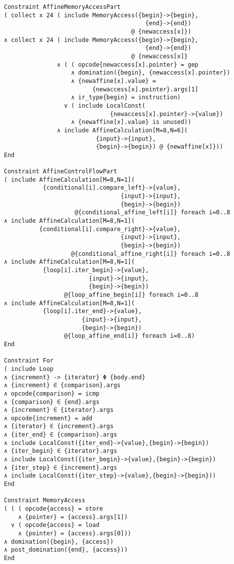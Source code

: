 \begin{lstlisting}
Constraint AffineMemoryAccessPart
( collect x 24 ( include MemoryAccess({begin}->{begin},
                                        {end}->{end})
                                    @ {newaccess[x]})
∧ collect x 24 ( include MemoryAccess({begin}->{begin},
                                        {end}->{end})
                                    @ {newaccess[x]}
               ∧ ( ( opcode{newaccess[x].pointer} = gep
                   ∧ domination({begin}, {newaccess[x].pointer})
                   ∧ {newaffine[x].value} =
                         {newaccess[x].pointer}.args[1]
                   ∧ ir_type{begin} = instruction)
                 ∨ ( include LocalConst(
                              {newaccess[x].pointer}->{value})
                   ∧ {newaffine[x].value} is unused))
               ∧ include AffineCalculation[M=8,N=6](
                          {input}->{input},
                          {begin}->{begin}) @ {newaffine[x]}))
End

Constraint AffineControlFlowPart
( include AffineCalculation[M=8,N=1](
           {conditional[i].compare_left}->{value},
                                 {input}->{input},
                                 {begin}->{begin})
                    @{conditional_affine_left[i]} foreach i=0..8
∧ include AffineCalculation[M=8,N=1](
          {conditional[i].compare_right}->{value},
                                 {input}->{input},
                                 {begin}->{begin})
                   @{conditional_affine_right[i]} foreach i=0..8
∧ include AffineCalculation[M=8,N=1](
           {loop[i].iter_begin}->{value},
                        {input}->{input},
                        {begin}->{begin})
                 @{loop_affine_begin[i]} foreach i=0..8
∧ include AffineCalculation[M=8,N=1](
           {loop[i].iter_end}->{value},
                      {input}->{input},
                      {begin}->{begin})
                 @{loop_affine_end[i]} foreach i=0..8)
End

Constraint For
( include Loop
∧ {increment} -> {iterator} Φ {body.end}
∧ {increment} ∈ {comparison}.args
∧ opcode{comparison} = icmp
∧ {comparison} ∈ {end}.args
∧ {increment} ∈ {iterator}.args
∧ opcode{increment} = add
∧ {iterator} ∈ {increment}.args
∧ {iter_end} ∈ {comparison}.args
∧ include LocalConst({iter_end}->{value},{begin}->{begin})
∧ {iter_begin} ∈ {iterator}.args
∧ include LocalConst({iter_begin}->{value},{begin}->{begin})
∧ {iter_step} ∈ {increment}.args
∧ include LocalConst({iter_step}->{value},{begin}->{begin}))
End

Constraint MemoryAccess
( ( ( opcode{access} = store
    ∧ {pointer} = {access}.args[1])
  ∨ ( opcode{access} = load
    ∧ {pointer} = {access}.args[0]))
∧ domination({begin}, {access})
∧ post_domination({end}, {access}))
End


\end{lstlisting}
